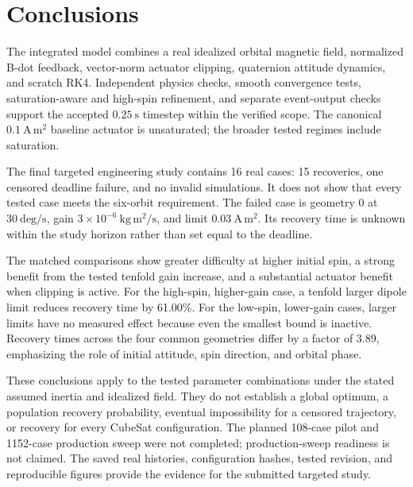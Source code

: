 \section{Conclusions}
The integrated model combines a real idealized orbital magnetic field,
normalized B-dot feedback, vector-norm actuator clipping, quaternion
attitude dynamics, and scratch RK4. Independent physics checks, smooth
convergence tests, saturation-aware and high-spin refinement, and separate
event-output checks support the accepted $0.25\ \mathrm{s}$ timestep within
the verified scope. The canonical $0.1\ \mathrm{A\,m^2}$ baseline actuator
is unsaturated; the broader tested regimes include saturation.

The final targeted engineering study contains 16 real cases: 15 recoveries,
one censored deadline failure, and no invalid simulations. It does not show
that every tested case meets the six-orbit requirement. The failed case is
geometry 0 at $30\ \mathrm{deg/s}$, gain $3\times10^{-6}\ \mathrm{kg\,m^2/s}$,
and limit $0.03\ \mathrm{A\,m^2}$. Its recovery time is unknown within the
study horizon rather than set equal to the deadline.

The matched comparisons show greater difficulty at higher initial spin,
a strong benefit from the tested tenfold gain increase, and a substantial
actuator benefit when clipping is active. For the high-spin, higher-gain
case, a tenfold larger dipole limit reduces recovery time by 61.00\%.
For the low-spin, lower-gain cases, larger limits have no measured effect
because even the smallest bound is inactive. Recovery times across the
four common geometries differ by a factor of 3.89, emphasizing the role of
initial attitude, spin direction, and orbital phase.

These conclusions apply to the tested parameter combinations under the
stated assumed inertia and idealized field. They do not establish a global
optimum, a population recovery probability, eventual impossibility for a
censored trajectory, or recovery for every CubeSat configuration. The
planned 108-case pilot and 1152-case production sweep were not completed;
production-sweep readiness is not claimed. The saved real histories,
configuration hashes, tested revision, and reproducible figures provide
the evidence for the submitted targeted study.
